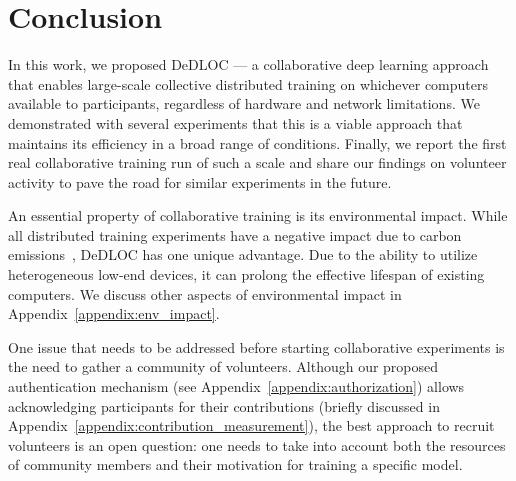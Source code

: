 \section{Conclusion}\label{sect:conclusion}

In this work, we proposed DeDLOC --- a collaborative deep learning approach that enables large-scale collective distributed training on whichever computers available to participants, regardless of hardware and network limitations.
We demonstrated with several experiments that this is a viable approach that maintains its efficiency in a broad range of conditions. Finally, we report the first real collaborative training run of such a scale and share our findings on volunteer activity to pave the road for similar experiments in the future.

An essential property of collaborative training is its environmental impact. While all distributed training experiments have a negative impact due to carbon emissions~\cite{Anthony2020CarbontrackerTA}, DeDLOC has one unique advantage. Due to the ability to utilize heterogeneous low-end devices, it can prolong the effective lifespan of existing computers. We discuss other aspects of environmental impact in Appendix~\ref{appendix:env_impact}.

One issue that needs to be addressed before starting collaborative experiments is the need to gather a community of volunteers. Although our proposed authentication mechanism (see Appendix~\ref{appendix:authorization}) allows acknowledging participants for their contributions (briefly discussed in Appendix~\ref{appendix:contribution_measurement}), the best approach to recruit volunteers is an open question: one needs to take into account both the resources of community members and their motivation for training a specific model.